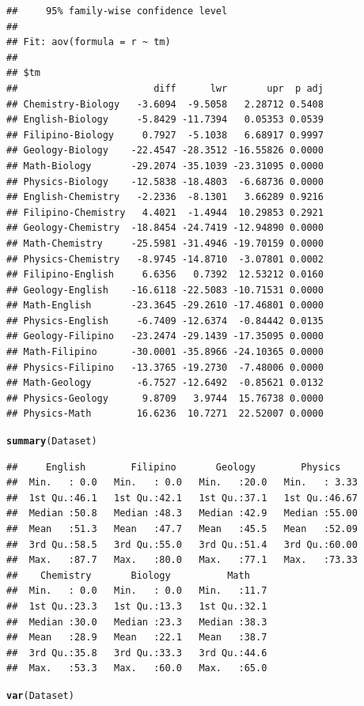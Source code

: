 \documentclass{article}\usepackage{graphicx, color}
\makeatletter
\newcommand{\hlfunctioncall}[1]{\textcolor[rgb]{0.501960784313725,0,0.329411764705882}{\textbf{#1}}}%
\newenvironment{kframe}{%
 \def\at@end@of@kframe{}%
 \ifinner\ifhmode%
  \def\at@end@of@kframe{\end{minipage}}%
  \begin{minipage}{\columnwidth}%
 \fi\fi%
 \def\FrameCommand##1{\hskip\@totalleftmargin \hskip-\fboxsep
 \colorbox{shadecolor}{##1}\hskip-\fboxsep
     \hskip-\linewidth \hskip-\@totalleftmargin \hskip\columnwidth}%
 \MakeFramed {\advance\hsize-\width
   \@totalleftmargin\z@ \linewidth\hsize
   \@setminipage}}%
 {\par\unskip\endMakeFramed%
 \at@end@of@kframe}
\newenvironment{knitrout}{}{} %
\makeatother
\begin{document}
\begin{knitrout}
\begin{kframe}
\begin{verbatim}
##     95% family-wise confidence level
## 
## Fit: aov(formula = r ~ tm)
## 
## $tm
##                        diff      lwr       upr  p adj
## Chemistry-Biology   -3.6094  -9.5058   2.28712 0.5408
## English-Biology     -5.8429 -11.7394   0.05353 0.0539
## Filipino-Biology     0.7927  -5.1038   6.68917 0.9997
## Geology-Biology    -22.4547 -28.3512 -16.55826 0.0000
## Math-Biology       -29.2074 -35.1039 -23.31095 0.0000
## Physics-Biology    -12.5838 -18.4803  -6.68736 0.0000
## English-Chemistry   -2.2336  -8.1301   3.66289 0.9216
## Filipino-Chemistry   4.4021  -1.4944  10.29853 0.2921
## Geology-Chemistry  -18.8454 -24.7419 -12.94890 0.0000
## Math-Chemistry     -25.5981 -31.4946 -19.70159 0.0000
## Physics-Chemistry   -8.9745 -14.8710  -3.07801 0.0002
## Filipino-English     6.6356   0.7392  12.53212 0.0160
## Geology-English    -16.6118 -22.5083 -10.71531 0.0000
## Math-English       -23.3645 -29.2610 -17.46801 0.0000
## Physics-English     -6.7409 -12.6374  -0.84442 0.0135
## Geology-Filipino   -23.2474 -29.1439 -17.35095 0.0000
## Math-Filipino      -30.0001 -35.8966 -24.10365 0.0000
## Physics-Filipino   -13.3765 -19.2730  -7.48006 0.0000
## Math-Geology        -6.7527 -12.6492  -0.85621 0.0132
## Physics-Geology      9.8709   3.9744  15.76738 0.0000
## Physics-Math        16.6236  10.7271  22.52007 0.0000
\end{verbatim}
\begin{alltt}
\hlfunctioncall{summary}(Dataset)
\end{alltt}
\begin{verbatim}
##     English        Filipino       Geology        Physics     
##  Min.   : 0.0   Min.   : 0.0   Min.   :20.0   Min.   : 3.33  
##  1st Qu.:46.1   1st Qu.:42.1   1st Qu.:37.1   1st Qu.:46.67  
##  Median :50.8   Median :48.3   Median :42.9   Median :55.00  
##  Mean   :51.3   Mean   :47.7   Mean   :45.5   Mean   :52.09  
##  3rd Qu.:58.5   3rd Qu.:55.0   3rd Qu.:51.4   3rd Qu.:60.00  
##  Max.   :87.7   Max.   :80.0   Max.   :77.1   Max.   :73.33  
##    Chemistry       Biology          Math     
##  Min.   : 0.0   Min.   : 0.0   Min.   :11.7  
##  1st Qu.:23.3   1st Qu.:13.3   1st Qu.:32.1  
##  Median :30.0   Median :23.3   Median :38.3  
##  Mean   :28.9   Mean   :22.1   Mean   :38.7  
##  3rd Qu.:35.8   3rd Qu.:33.3   3rd Qu.:44.6  
##  Max.   :53.3   Max.   :60.0   Max.   :65.0
\end{verbatim}
\begin{alltt}
\hlfunctioncall{var}(Dataset)
\end{alltt}
\begin{verbatim}

\end{verbatim}
\end{kframe}
\end{knitrout}
\end{document}
